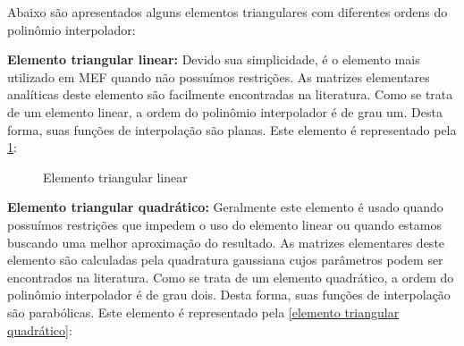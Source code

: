 \vspace{0.5cm}
Abaixo são apresentados alguns elementos triangulares com
diferentes ordens do polinômio interpolador:

\medskip
\noindent
\textbf{Elemento triangular linear:} Devido sua simplicidade, é o elemento
mais utilizado em MEF quando não possuímos restrições. As matrizes elementares
analíticas deste elemento são facilmente encontradas na literatura. Como se trata
de um elemento linear, a ordem do polinômio interpolador é de grau um. Desta forma,
suas funções de interpolação são planas. 
Este elemento é representado pela \ref{elemento triangular linear}:

\begin{figure}[H]
\begin{center}
\end{center}
\caption{Elemento triangular linear}
\label{elemento triangular linear}
\end{figure}



\medskip
\noindent
\textbf{Elemento triangular quadrático:} Geralmente este elemento é usado quando
possuímos restrições que impedem o uso do elemento linear ou quando estamos buscando uma
melhor aproximação do resultado. As matrizes elementares 
deste elemento são calculadas pela quadratura gaussiana cujos parâmetros podem ser
encontrados na literatura. Como se trata de um elemento quadrático, a ordem do polinômio 
interpolador é de grau dois. Desta forma, suas funções de interpolação são parabólicas.
Este elemento é representado pela \ref{elemento triangular quadrático}:

